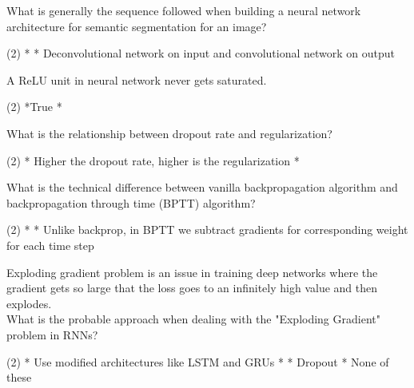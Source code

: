 \documentclass[10pt]{extarticle}
\begin{document}
\begin{exercise}
    What is generally the sequence followed when building a neural network architecture for semantic segmentation for an image?
    \begin{choice} (2)
        *
        * Deconvolutional network on input and convolutional network on output
    \end{choice}
\end{exercise}
\begin{solution}
\end{solution}

\begin{exercise}
    A ReLU unit in neural network never gets saturated.
    \begin{choice} (2)
        *True
        *
    \end{choice}
\end{exercise}
\begin{solution}
\end{solution}

\begin{exercise}
    What is the relationship between dropout rate and regularization?
    \begin{choice} (2)
        * Higher the dropout rate, higher is the regularization
        *
    \end{choice}
\end{exercise}
\begin{solution}
\end{solution}

\begin{exercise}
    What is the technical difference between vanilla backpropagation algorithm and backpropagation through time (BPTT) algorithm?
    \begin{choice} (2)
        *
        * Unlike backprop, in BPTT we subtract gradients for corresponding weight for each time step
    \end{choice}
\end{exercise}
\begin{solution}
\end{solution}

\begin{exercise}
    Exploding gradient problem is an issue in training deep networks where the gradient gets so large that the loss goes to an infinitely high value and then explodes.\\ What is the probable approach when dealing with the "Exploding Gradient" problem in RNNs?
    \begin{choice} (2)
        * Use modified architectures like LSTM and GRUs
        *
        * Dropout
        * None of these
    \end{choice}
\end{exercise}
\begin{solution}
\end{solution}
\end{document}
